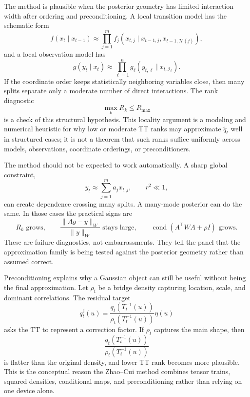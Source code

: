 \documentclass[11pt]{article}
\numberwithin{equation}{section}
\begin{document}
The method is plausible when the posterior geometry has limited interaction
width after ordering and preconditioning.  A local transition model has the
schematic form
\begin{equation}
    f(x_t\mid x_{t-1})
    \approx
    \prod_{j=1}^m f_j(x_{t,j}\mid x_{t-1,j},x_{t-1,\mathcal N(j)}),
    \label{eq:p25-bridge-14}
\end{equation}
and a local observation model has
\begin{equation}
    g(y_t\mid x_t)
    \approx
    \prod_{\ell=1}^n g_\ell(y_{t,\ell}\mid x_{t,\mathcal I_\ell}).
    \label{eq:p25-bridge-15}
\end{equation}
If the coordinate order keeps statistically neighboring variables close, then
many splits separate only a moderate number of direct interactions.  The rank
diagnostic
\begin{equation}
    \max_k R_k\le R_{\max}
    \label{eq:p25-bridge-16}
\end{equation}
is a check of this structural hypothesis.
This locality argument is a modeling and numerical heuristic for why low or
moderate TT ranks may approximate \(\widetilde q_t\) well in structured cases;
it is not a theorem that such ranks suffice uniformly across models,
observations, coordinate orderings, or preconditioners.

The method should not be expected to work automatically.  A sharp global
constraint,
\begin{equation}
    y_t\approx\sum_{j=1}^m a_jx_{t,j},
    \qquad r^2\ll1,
    \label{eq:p25-bridge-17}
\end{equation}
can create dependence crossing many splits.  A many-mode posterior can do the
same.  In those cases the practical signs are
\begin{equation}
    R_k \text{ grows},\qquad
    \frac{\|Ag-y\|_W}{\|y\|_W} \text{ stays large},\qquad
    \operatorname{cond}(A^\top W A+\rho I)\text{ grows}.
    \label{eq:p25-bridge-18}
\end{equation}
These are failure diagnostics, not embarrassments.  They tell the panel that
the approximation family is being tested against the posterior geometry rather
than assumed correct.

Preconditioning explains why a Gaussian object can still be useful without
being the final approximation.  Let \(\rho_t\) be a bridge density capturing
location, scale, and dominant correlations.  The residual target
\begin{equation}
    q_t^\sharp(u)
    =
    \frac{q_t(T_t^{-1}(u))}{\rho_t(T_t^{-1}(u))}\eta(u)
    \label{eq:p25-bridge-19}
\end{equation}
asks the TT to represent a correction factor.  If \(\rho_t\) captures the main
shape, then
\begin{equation}
    \frac{q_t(T_t^{-1}(u))}{\rho_t(T_t^{-1}(u))}
    \label{eq:p25-bridge-20}
\end{equation}
is flatter than the original density, and lower TT rank becomes more plausible.
This is the conceptual reason the Zhao--Cui method combines tensor trains,
squared densities, conditional maps, and preconditioning rather than relying on
one device alone.
\end{document}
